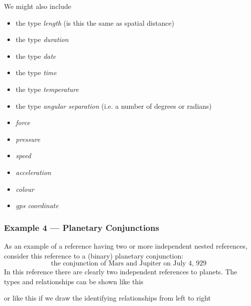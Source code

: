 \mynote We might also include
\begin{itemize}
	\item the type \textit{length} (is this the same as spatial distance)
	\item the type \textit{duration}
	\item the type \textit{date}
	\item the type \textit{time}
	\item the type \textit{temperature}
	\item the type \textit{angular separation} (i.e. a number of degrees or radians)
	\item \textit{force}
	\item \textit{pressure}
	\item \textit{speed}
	\item \textit{acceleration}
	\item \textit{colour}
	\item \textit{gps coordinate}
\end{itemize}

\begin{worktt}
\subsubsection{Example 4 --- Planetary Conjunctions} 
As an example of a reference having two or more independent  nested references, consider this reference to  a (binary) planetary conjunction:
\begin{equation}
\mbox{the conjunction of Mars and Jupiter on July 4, 929}
\end{equation}
In this reference there are clearly two independent references to planets. 
The types and relationships can be shown like this

\begin{equation*}

\end{equation*}
or like this if we draw the identifying relationships from left to right

\begin{equation*}

\end{equation*}
\end{worktt}